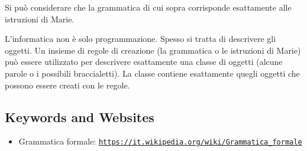 \documentclass[a4paper,11pt]{report}
\newcommand{\BrochureUrlText}[1]{\texttt{#1}}
\begin{document}
Si può considerare che la grammatica di cui sopra corrisponde esattamente alle istruzioni di Marie.

L’informatica non è solo programmazione. Spesso si tratta di descrivere gli oggetti. Un insieme di regole di creazione (la grammatica o le istruzioni di Marie) può essere utilizzato per descrivere esattamente una classe di oggetti (alcune parole o i possibili braccialetti). La classe contiene esattamente quegli oggetti che possono essere creati con le regole.

{\raggedright

\subsection*{Keywords and Websites}

\begin{itemize}
  \item Grammatica formale: \href{https://it.wikipedia.org/wiki/Grammatica_formale}{\BrochureUrlText{https://it.wikipedia.org/wiki/Grammatica\_formale}}
\end{itemize}


}
\end{document}
